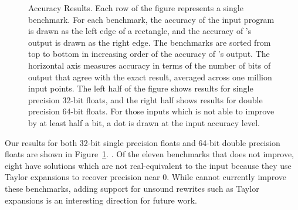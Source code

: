 \documentclass[paper.tex]{subfiles}
\begin{document}
\begin{figure}
\begin{tabular}{cc}
  \end{tabular}
  \caption{Accuracy Results. Each row of the figure represents a
    single benchmark. For each benchmark, the accuracy of the input
    program is drawn as the left edge of a rectangle, and the accuracy
    of \casio's output is drawn as the right edge.  The benchmarks are
    sorted from top to bottom in increasing order of the accuracy of
    \casio's output. The horizontal axis measures accuracy in terms of
    the number of bits of output that agree with the exact result,
    averaged across one million input points. The left half of the
    figure shows results for single precision 32-bit floats, and the
    right half shows results for double precision 64-bit floats. For
    those inputs which \casio is not able to improve by at least half
    a bit, a dot is drawn at the input accuracy level. }
  \label{fig:eval-rect}
\end{figure}

 Our results for both 32-bit single precision floats
and 64-bit double precision floats are shown in
Figure~\ref{fig:eval-rect}. . Of
the eleven benchmarks that \casio does not improve, eight have
solutions which are not real-equivalent to the input because they use
Taylor expansions to recover precision near 0. While \casio cannot
currently improve these benchmarks, adding support for unsound
rewrites such as Taylor expansions is an interesting direction for
future work.
\end{document}
